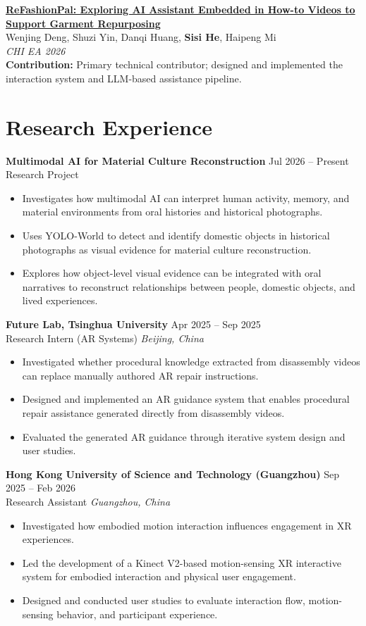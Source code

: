 \documentclass[10pt,letterpaper]{article}
\newcommand{\entry}[4]{
  \textbf{#1} \hfill #2\\
  #3 \hfill \textit{#4}
}
\newcommand{\paper}[4]{
  #1\\
  #2\\
  \textit{#3}\\
  #4
}
\begin{document}
\paper{\href{https://doi.org/10.1145/3772363.3798775}{\textbf{ReFashionPal: Exploring AI Assistant Embedded in How-to Videos to Support Garment Repurposing}}}
{Wenjing Deng, Shuzi Yin, Danqi Huang, \textbf{Sisi He}, Haipeng Mi}
{CHI EA 2026}
{\textbf{Contribution:} Primary technical contributor; designed and implemented the interaction system and LLM-based assistance pipeline.}

\section{Research Experience}

\entry{Multimodal AI for Material Culture Reconstruction}{Jul 2026 -- Present}
{Research Project}{}
\begin{itemize}
    \item Investigates how multimodal AI can interpret human activity, memory, and material environments from oral histories and historical photographs.
    \item Uses YOLO-World to detect and identify domestic objects in historical photographs as visual evidence for material culture reconstruction.
    \item Explores how object-level visual evidence can be integrated with oral narratives to reconstruct relationships between people, domestic objects, and lived experiences.
\end{itemize}

\entry{Future Lab, Tsinghua University}{Apr 2025 -- Sep 2025}
{Research Intern (AR Systems)}{Beijing, China}
\begin{itemize}
    \item Investigated whether procedural knowledge extracted from disassembly videos can replace manually authored AR repair instructions.
    \item Designed and implemented an AR guidance system that enables procedural repair assistance generated directly from disassembly videos.
    \item Evaluated the generated AR guidance through iterative system design and user studies.
\end{itemize}

\entry{Hong Kong University of Science and Technology (Guangzhou)}{Sep 2025 -- Feb 2026}
{Research Assistant}{Guangzhou, China}
\begin{itemize}
    \item Investigated how embodied motion interaction influences engagement in XR experiences.
    \item Led the development of a Kinect V2-based motion-sensing XR interactive system for embodied interaction and physical user engagement.
    \item Designed and conducted user studies to evaluate interaction flow, motion-sensing behavior, and participant experience.
\end{itemize}
\end{document}

